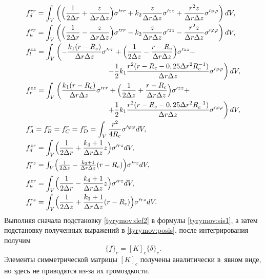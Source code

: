 \begin{equation}\label{tyrymov:posis}
    \begin{array}{l}
\displaystyle  
      f_d^{rr}=\int_V\left( \Bigl(\frac{1}{2\Delta r}+\frac{z}{\Delta r\Delta z}\Bigr)\sigma'^{rr}
      +k_2\frac{z}{\Delta r\Delta z}\sigma'^{zz}+\frac{r^2z}{\Delta r\Delta z}\sigma'^{\varphi\varphi}\right)dV,
\\[3mm]
\displaystyle 
       f_u^{rr}=\int_V\left(\Bigl(\frac{1}{2\Delta r}-\frac{z}{\Delta r\Delta z}\Bigr)\sigma'^{rr}
      -k_2\frac{z}{\Delta r\Delta z}\sigma'^{zz}-\frac{r^2z}{\Delta r\Delta z}\sigma'^{\varphi\varphi}\right)dV,
\\[3mm]
\displaystyle 
f_l^{zz}=\int_V\left(-\frac{k_1(r-R_c)}{\Delta r\Delta z}\sigma'^{rr}+
      \Bigl(\frac{1}{2\Delta z}-\frac{r-R_c}{\Delta r\Delta z}\Bigr)\sigma'^{zz}-\right.
      \\[3mm]
\displaystyle  \hspace{4cm}
      \left.-\frac{1}{2}k_1\frac{r^2(r-R_c-0,25\Delta r^2R_c^{-1})}{\Delta r\Delta z}\sigma'^{\varphi\varphi}\right)dV,
\\[3mm]
\displaystyle 
f_r^{zz}=\int_V\left(\frac{k_1(r-R_c)}{\Delta r\Delta z}\sigma'^{rr}+
      \Bigl(\frac{1}{2\Delta z}+\frac{r-R_c}{\Delta r\Delta z}\Bigr)\sigma'^{zz}+\right.
      \\[3mm]
\displaystyle  \hspace{4cm}
      \left.+\frac{1}{2}k_1\frac{r^2(r-R_c-0,25\Delta r^2R_c^{-1})}{\Delta r\Delta z}\sigma'^{\varphi\varphi}\right)dV,
\\[3mm]
       \displaystyle
       f_A^r=f_B^r=f_C^r=f_D^r=\int_V\frac{r^2}{4R_c}\sigma'^{\varphi\varphi}dV,
\\[3mm]
       \displaystyle f_d^{zr}=\int_V\Bigl(\frac{1}{2\Delta r}+\frac{k_4+1}{\Delta r\Delta z}z\Bigr)\sigma'^{rz}dV,
\\[3mm]
      f_l^{rz}=\int_V\Bigl(\frac{1}{2\Delta z}-\frac{k_3+1}{\Delta r\Delta z}(r-R_c)\Bigr)\sigma'^{rz}dV,
\\[3mm]
      \displaystyle f_u^{zr}=\int_V\Bigl(\frac{1}{2\Delta r}-\frac{k_4+1}{\Delta r\Delta z}z\Bigr)\sigma'^{rz}dV, 
\\[3mm]
      \displaystyle      f_r^{rz}=\int_V\Bigl(\frac{1}{2\Delta z}+\frac{k_3+1}{\Delta r\Delta z}(r-R_c)\Bigr)\sigma'^{rz}dV.
    \end{array}
\end{equation}
Выполняя сначала подстановку \eqref{tyrymov:def2} в формулы \eqref{tyrymov:sis1}, 
а затем подстановку полученных выражений в \eqref{tyrymov:posis}, после интегрирования получим
\begin{equation}\label{tyrymov:urpos}
    \{f\}_c=[K]_c\{\delta\}_c.
\end{equation}
Элементы симметрической матрицы $[K]_c$  получены аналитически в~явном виде, но здесь не приводятся из-за их громоздкости.

